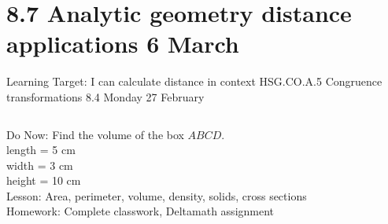 \section{8.7 Analytic geometry distance applications \hfill 6 March \,}
\begin{frame}{Learning Target: I can calculate distance in context}
  {HSG.CO.A.5 Congruence transformations \hfill \alert{8.4 Monday 27 February}}
  \begin{columns}
    Do Now: Find the volume of the box $ABCD$. \\
    length = 5 cm \\
    width = 3 cm\\
    height = 10 cm \\[0.5cm]
    Lesson: Area, perimeter, volume, density, solids, cross sections \\
    Homework: Complete classwork, Deltamath assignment
    \begin{flushright}
    \end{flushright}
  \end{columns}
\end{frame}

